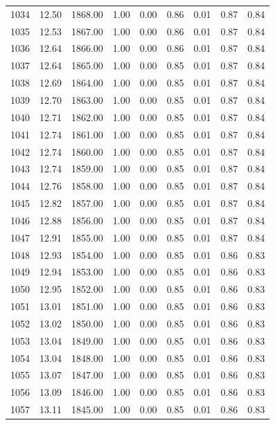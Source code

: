 \documentclass{article}\usepackage[]{graphicx}\usepackage[]{color}
\begin{document}
\begin{longtable}{rrrrrrrrr}
  1034 & 12.50 & 1868.00 & 1.00 & 0.00 & 0.86 & 0.01 & 0.87 & 0.84 \\ 
  1035 & 12.53 & 1867.00 & 1.00 & 0.00 & 0.86 & 0.01 & 0.87 & 0.84 \\ 
  1036 & 12.64 & 1866.00 & 1.00 & 0.00 & 0.86 & 0.01 & 0.87 & 0.84 \\ 
  1037 & 12.64 & 1865.00 & 1.00 & 0.00 & 0.85 & 0.01 & 0.87 & 0.84 \\ 
  1038 & 12.69 & 1864.00 & 1.00 & 0.00 & 0.85 & 0.01 & 0.87 & 0.84 \\ 
  1039 & 12.70 & 1863.00 & 1.00 & 0.00 & 0.85 & 0.01 & 0.87 & 0.84 \\ 
  1040 & 12.71 & 1862.00 & 1.00 & 0.00 & 0.85 & 0.01 & 0.87 & 0.84 \\ 
  1041 & 12.74 & 1861.00 & 1.00 & 0.00 & 0.85 & 0.01 & 0.87 & 0.84 \\ 
  1042 & 12.74 & 1860.00 & 1.00 & 0.00 & 0.85 & 0.01 & 0.87 & 0.84 \\ 
  1043 & 12.74 & 1859.00 & 1.00 & 0.00 & 0.85 & 0.01 & 0.87 & 0.84 \\ 
  1044 & 12.76 & 1858.00 & 1.00 & 0.00 & 0.85 & 0.01 & 0.87 & 0.84 \\ 
  1045 & 12.82 & 1857.00 & 1.00 & 0.00 & 0.85 & 0.01 & 0.87 & 0.84 \\ 
  1046 & 12.88 & 1856.00 & 1.00 & 0.00 & 0.85 & 0.01 & 0.87 & 0.84 \\ 
  1047 & 12.91 & 1855.00 & 1.00 & 0.00 & 0.85 & 0.01 & 0.87 & 0.84 \\ 
  1048 & 12.93 & 1854.00 & 1.00 & 0.00 & 0.85 & 0.01 & 0.86 & 0.83 \\ 
  1049 & 12.94 & 1853.00 & 1.00 & 0.00 & 0.85 & 0.01 & 0.86 & 0.83 \\ 
  1050 & 12.95 & 1852.00 & 1.00 & 0.00 & 0.85 & 0.01 & 0.86 & 0.83 \\ 
  1051 & 13.01 & 1851.00 & 1.00 & 0.00 & 0.85 & 0.01 & 0.86 & 0.83 \\ 
  1052 & 13.02 & 1850.00 & 1.00 & 0.00 & 0.85 & 0.01 & 0.86 & 0.83 \\ 
  1053 & 13.04 & 1849.00 & 1.00 & 0.00 & 0.85 & 0.01 & 0.86 & 0.83 \\ 
  1054 & 13.04 & 1848.00 & 1.00 & 0.00 & 0.85 & 0.01 & 0.86 & 0.83 \\ 
  1055 & 13.07 & 1847.00 & 1.00 & 0.00 & 0.85 & 0.01 & 0.86 & 0.83 \\ 
  1056 & 13.09 & 1846.00 & 1.00 & 0.00 & 0.85 & 0.01 & 0.86 & 0.83 \\ 
  1057 & 13.11 & 1845.00 & 1.00 & 0.00 & 0.85 & 0.01 & 0.86 & 0.83 \\ 

\end{longtable}
\end{document}
